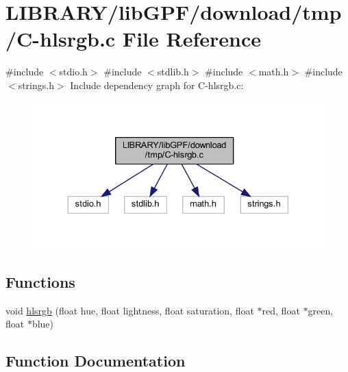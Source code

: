 \hypertarget{C-hlsrgb_8c}{}\section{L\+I\+B\+R\+A\+R\+Y/lib\+G\+P\+F/download/tmp/\+C-\/hlsrgb.c File Reference}
\label{C-hlsrgb_8c}
{\ttfamily \#include $<$stdio.\+h$>$}\newline
{\ttfamily \#include $<$stdlib.\+h$>$}\newline
{\ttfamily \#include $<$math.\+h$>$}\newline
{\ttfamily \#include $<$strings.\+h$>$}\newline
Include dependency graph for C-\/hlsrgb.c\+:
\nopagebreak
\begin{figure}[H]
\begin{center}
\leavevmode
\includegraphics[width=330pt]{C-hlsrgb_8c__incl}
\end{center}
\end{figure}
\subsection*{Functions}
\begin{DoxyCompactItemize}
\item 
void \hyperlink{C-hlsrgb_8c_ad9e23862110e6afd4136221b830b29e7}{hlsrgb} (float hue, float lightness, float saturation, float $\ast$red, float $\ast$green, float $\ast$blue)
\end{DoxyCompactItemize}


\subsection{Function Documentation}
\mbox{\label{C-hlsrgb_8c_ad9e23862110e6afd4136221b830b29e7}} 
